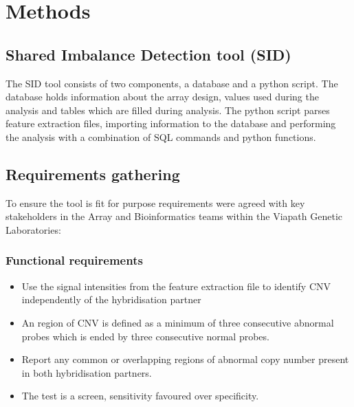 \chapter{Methods}\label{ch:Methods}
\section{Shared Imbalance Detection tool (SID)}
The \ac{SID} tool consists of two components, a database and a python script. The database holds information about the array design, values used during the analysis and tables which are filled during analysis. The python script parses feature extraction files, importing information to the database and performing the analysis with a combination of SQL commands and python functions.

\section{Requirements gathering}\label{Requirements}
To ensure the tool is fit for purpose requirements were agreed with key stakeholders in the Array and Bioinformatics teams within the Viapath Genetic Laboratories:
\subsection{Functional requirements}
\begin{itemize}
\item Use the signal intensities from the feature extraction file to identify \ac{CNV} independently of the hybridisation partner
\item An region of \ac{CNV} is defined as a minimum of three consecutive abnormal probes which is ended by three consecutive normal probes.
\item Report any common or overlapping regions of abnormal copy number present in both hybridisation partners.
\item The test is a screen, sensitivity favoured over specificity.
\end{itemize}

